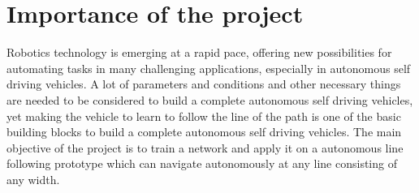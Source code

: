 \documentclass[14pt,a4paper]{extarticle}
\begin{document}
	\section{Importance of the project}
	
	Robotics technology is emerging at a rapid pace, offering new possibilities for automating tasks in many challenging applications, especially in autonomous self driving vehicles. A lot of parameters and conditions and other necessary things are needed to be considered to build a complete autonomous self driving vehicles, yet making the vehicle to learn to follow the line of the path is one of the basic building blocks to build a complete autonomous self driving vehicles. The main objective of the project is to train a network and apply it on a autonomous line following prototype which can navigate autonomously at any line consisting of any width.
	
\end{document}
